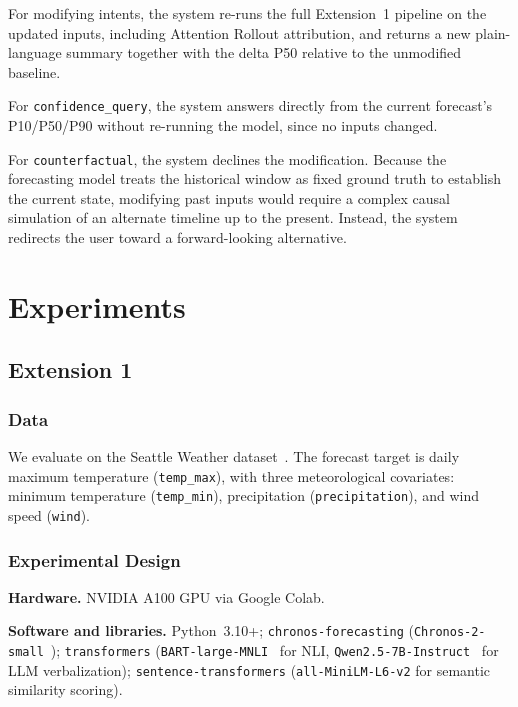 \documentclass[conference]{IEEEtran}
\begin{document}
For modifying intents, the system re-runs the full Extension~1 pipeline on the updated inputs, including Attention Rollout attribution, and returns a new plain-language summary together with the delta P50 relative to the unmodified baseline.

For \texttt{confidence\_query}, the system answers directly from the current forecast's P10/P50/P90 without re-running the model, since no inputs changed.

For \texttt{counterfactual}, the system declines the modification. Because the forecasting model treats the historical window as fixed ground truth to establish the current state, modifying past inputs would require a complex causal simulation of an alternate timeline up to the present. Instead, the system redirects the user toward a forward-looking alternative.


\section{Experiments}

\subsection{Extension 1}

\subsubsection{Data}

We evaluate on the Seattle Weather dataset~\cite{vega_seattle_weather}.
The forecast target is daily maximum temperature (\texttt{temp\_max}), with three meteorological covariates: minimum temperature (\texttt{temp\_min}), precipitation (\texttt{precipitation}), and wind speed (\texttt{wind}).

\subsubsection{Experimental Design}

\textbf{Hardware.} NVIDIA A100 GPU via Google Colab.

\textbf{Software and libraries.} Python~3.10+; \texttt{chronos-forecasting} (\texttt{Chronos-2-small}~\cite{chronos2}); \texttt{transformers} (\texttt{BART-large-MNLI}~\cite{lewis2020bart} for NLI, \texttt{Qwen2.5-7B-Instruct}~\cite{qwen} for LLM verbalization); \texttt{sentence-transformers} (\texttt{all-MiniLM-L6-v2} for semantic similarity scoring).
\end{document}

